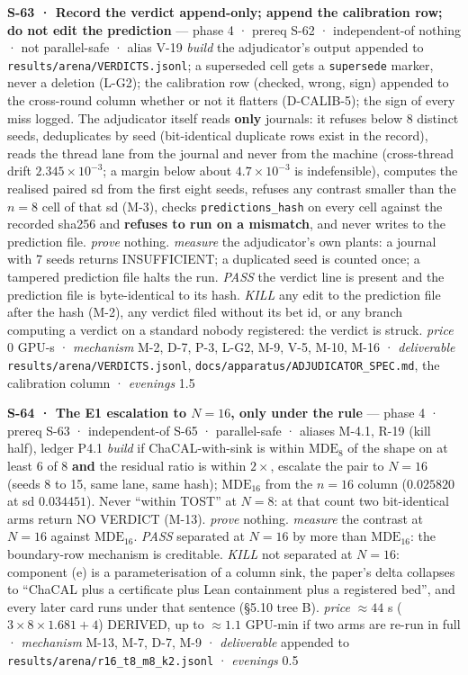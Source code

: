 \documentclass[11pt,a4paper]{article}
\theoremstyle{plain}
\theoremstyle{definition}
\theoremstyle{remark}
\begin{document}
\textbf{S-63 · Record the verdict append-only; append the calibration
row; do not edit the prediction} --- phase 4 · prereq S-62 ·
independent-of nothing · not parallel-safe · alias V-19 \emph{build} the
adjudicator's output appended to \texttt{results/arena/VERDICTS.jsonl};
a superseded cell gets a \texttt{supersede} marker, never a deletion
(L-G2); the calibration row (checked, wrong, sign) appended to the
cross-round column whether or not it flatters (D-CALIB-5); the sign of
every miss logged. The adjudicator itself reads \textbf{only} journals:
it refuses below 8 distinct seeds, deduplicates by seed (bit-identical
duplicate rows exist in the record), reads the thread lane from the
journal and never from the machine (cross-thread drift
\(2.345\times10^{-3}\); a margin below about \(4.7\times10^{-3}\) is
indefensible), computes the realised paired sd from the first eight
seeds, refuses any contrast smaller than the \(n=8\) cell of that sd
(M-3), checks \texttt{predictions\_hash} on every cell against the
recorded sha256 and \textbf{refuses to run on a mismatch}, and never
writes to the prediction file. \emph{prove} nothing. \emph{measure} the
adjudicator's own plants: a journal with 7 seeds returns INSUFFICIENT; a
duplicated seed is counted once; a tampered prediction file halts the
run. \emph{PASS} the verdict line is present and the prediction file is
byte-identical to its hash. \emph{KILL} any edit to the prediction file
after the hash (M-2), any verdict filed without its bet id, or any
branch computing a verdict on a standard nobody registered: the verdict
is struck. \emph{price} \(0\) GPU-s · \emph{mechanism} M-2, D-7, P-3,
L-G2, M-9, V-5, M-10, M-16 · \emph{deliverable}
\texttt{results/arena/VERDICTS.jsonl},
\texttt{docs/apparatus/ADJUDICATOR\_SPEC.md}, the calibration column ·
\emph{evenings} 1.5

\textbf{S-64 · The E1 escalation to \(N=16\), only under the rule} ---
phase 4 · prereq S-63 · independent-of S-65 · parallel-safe · aliases
M-4.1, R-19 (kill half), ledger P4.1 \emph{build} if ChaCAL-with-sink is
within \(\mathrm{MDE}_8\) of the shape on at least 6 of 8 \textbf{and}
the residual ratio is within \(2\times\), escalate the pair to \(N=16\)
(seeds 8 to 15, same lane, same hash); \(\mathrm{MDE}_{16}\) from the
\(n=16\) column (\(0.025820\) at sd \(0.034451\)). Never ``within TOST''
at \(N=8\): at that count two bit-identical arms return NO VERDICT
(M-13). \emph{prove} nothing. \emph{measure} the contrast at \(N=16\)
against \(\mathrm{MDE}_{16}\). \emph{PASS} separated at \(N=16\) by more
than \(\mathrm{MDE}_{16}\): the boundary-row mechanism is creditable.
\emph{KILL} not separated at \(N=16\): component (e) is a
parameterisation of a column sink, the paper's delta collapses to
``ChaCAL plus a certificate plus Lean containment plus a registered
bed'', and every later card runs under that sentence (§5.10 tree B).
\emph{price} \(\approx44\) s (\(3\times8\times1.681+4\)) DERIVED, up to
\(\approx1.1\) GPU-min if two arms are re-run in full · \emph{mechanism}
M-13, M-7, D-7, M-9 · \emph{deliverable} appended to
\texttt{results/arena/r16\_t8\_m8\_k2.jsonl} · \emph{evenings} 0.5
\end{document}
